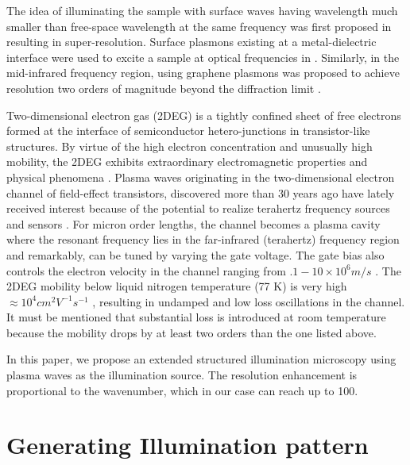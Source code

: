 \documentclass[11pt]{article}
\begin{document}
The idea of illuminating the sample with surface waves having wavelength much smaller than free-space wavelength at the same frequency was first proposed in \cite{Nassenstein_1970} resulting in super-resolution. Surface plasmons existing at a metal-dielectric interface were used to excite a sample at optical frequencies in \cite{Wei_2010}. Similarly, in the mid-infrared frequency region, using graphene plasmons was proposed to achieve resolution two orders of magnitude beyond  the diffraction limit \cite{Zeng_2014}.

Two-dimensional electron gas (2DEG) is a tightly confined sheet of free electrons formed at the interface of semiconductor hetero-junctions in transistor-like structures. By virtue of the high electron concentration and unusually high mobility, the 2DEG exhibits extraordinary electromagnetic properties and physical phenomena \cite{Andress_2012,Tsui_1982,Reyren_2007}.
Plasma waves originating in the two-dimensional electron channel of field-effect transistors, discovered more than 30 years ago have lately received interest because of the potential to realize terahertz frequency sources and sensors \cite{Dyakonov_1993,Dyakonov_1996,Popov_2008,Otsuji_2006,Muravjov_2010}. For micron order lengths, the channel becomes a plasma cavity where the resonant frequency lies in the far-infrared (terahertz) frequency region and remarkably, can be tuned by varying the gate voltage. The gate bias also controls the electron velocity in the channel ranging from $.1 - 10 \times 10^6 m/s$ \cite{Burke_2000}. The 2DEG mobility below liquid nitrogen temperature (77 K) is very high $\approx 10^4 cm^2 V^{−1} s^{−1}$ \cite{Muravjov_2010}, resulting in undamped and low loss oscillations in the channel. It must be mentioned that substantial loss is introduced at room temperature because the mobility drops by at least two orders than the one listed above.

In this paper, we propose an extended structured illumination microscopy using plasma waves as the illumination source. The resolution enhancement is proportional to the wavenumber, which in our case can reach up to 100.

\section{Generating Illumination pattern}

\end{document}
